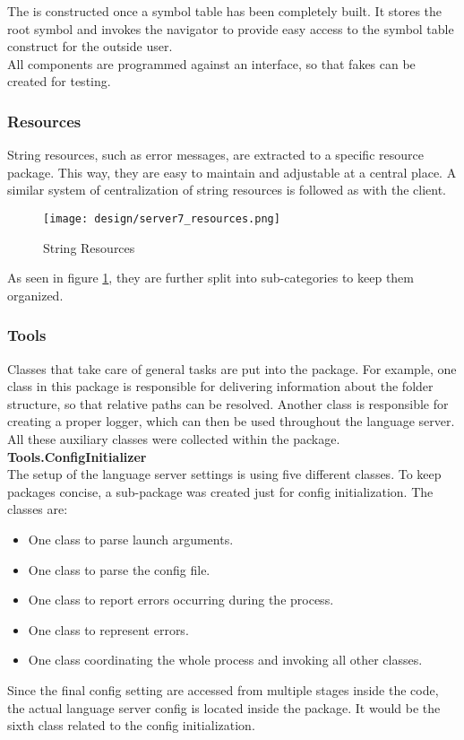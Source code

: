 The  is constructed once a symbol table has been completely built.
It stores the root symbol and invokes the navigator to provide easy access to the symbol table construct for the outside user.\\

All components are programmed against an interface, so that fakes can be created for testing.\\

\subsubsection{Resources}
String resources, such as error messages, are extracted to a specific resource package.
This way, they are easy to maintain and adjustable at a central place.
A similar system of centralization of string resources is followed as with the client.

\begin{figure}[H]
    \centering
    \texttt{[image: design/server7\_resources.png]}
    \caption{String Resources}
    \label{fig:server_resources}
\end{figure}

As seen in figure \ref{fig:server_resources}, they are further split into sub-categories to keep them organized.

\subsubsection{Tools}
Classes that take care of general tasks are put into the  package.
For example, one class in this package is responsible for delivering information about the folder structure, so that relative paths can be resolved.
Another class is responsible for creating a proper logger, which can then be used throughout the language server.
All these auxiliary classes were collected within the  package.\\

\textbf{Tools.ConfigInitializer}\\
The setup of the language server settings is using five different classes.
To keep packages concise, a sub-package was created just for config initialization.
The classes are:
\begin{itemize}
    \item One class to parse launch arguments.
    \item One class to parse the config file.
    \item One class to report errors occurring during the process.
    \item One class to represent errors.
    \item One class coordinating the whole process and invoking all other classes.
\end{itemize}
Since the final config setting are accessed from multiple stages inside the code, the actual language server config is located inside the  package.
It would be the sixth class related to the config initialization.

